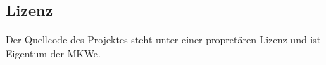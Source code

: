 \subsection{Lizenz}
Der Quellcode des Projektes steht unter einer propretären Lizenz und ist Eigentum der MKWe. 

